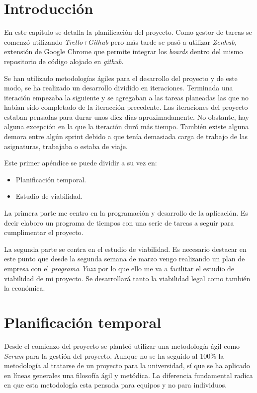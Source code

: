 
\section{Introducción}\label{introduccion-plan}
En este capitulo se detalla la planificación del proyecto. Como gestor de tareas se comenzó utilizando \emph{Trello+Github} pero más tarde se pasó a utilizar \emph{Zenhub,} extensión de Google Chrome que permite integrar los \emph{boards} dentro del mismo repositorio de código alojado en \emph{github}. 

Se han utilizado metodologías ágiles para el desarrollo del proyecto y de este modo, se ha realizado un desarrollo dividido en iteraciones. Terminada una iteración empezaba la siguiente y se agregaban a las tareas planeadas las que no habían sido completado de la iteracción precedente. Las iteraciones del proyecto estaban pensadas para durar unos diez días aproximadamente. No obstante, hay alguna excepción en la que la iteración duró más tiempo. También existe alguna demora entre algún sprint debido a que tenía demasiada carga de trabajo de las asignaturas, trabajaba o estaba de viaje. 

Este primer apéndice se puede dividir a su vez en:

\begin{itemize}
\tightlist
\item
  Planificación temporal.
\item
  Estudio de viabilidad.
\end{itemize} 

La primera parte me centro en la programación y desarrollo de la aplicación. Es decir elaboro un programa de tiempos con una serie de tareas a seguir para cumplimentar el proyecto.

La segunda parte se centra en el estudio de viabilidad. Es necesario destacar en este punto que desde la segunda semana de marzo vengo realizando un plan de empresa con el \emph{programa Yuzz} por lo que ello me va a facilitar el estudio de viabilidad de mi proyecto. Se desarrollará tanto la viabilidad legal como también la económica. 


\section{Planificación temporal}\label{planificacion-temporal}
Desde el comienzo del proyecto se planteó utilizar una metodología ágil como
\emph{Scrum} para la gestión del proyecto. Aunque no se ha seguido al 100\% la
metodología al tratarse de un proyecto para la universidad, sí que se ha aplicado
en líneas generales una filosofía ágil y metódica. La diferencia fundamental radica en que esta metodología esta pensada para equipos y no para individuos.

